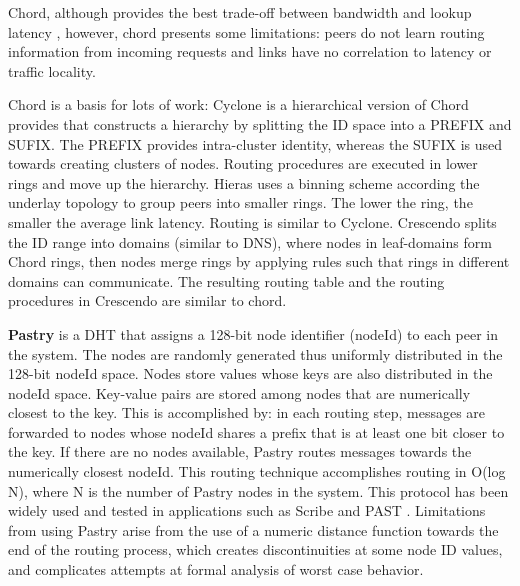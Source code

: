 Chord, although provides the best trade-off between bandwidth and lookup latency \cite{dht_performance_churn}, however, chord presents some limitations: peers do not learn routing information from incoming requests and links have no correlation to latency or traffic locality.

Chord is a basis for lots of work: Cyclone \cite{Artigas2005} is a hierarchical version of Chord provides that constructs a hierarchy by splitting the ID space into a PREFIX and SUFIX. The PREFIX provides intra-cluster identity, whereas the SUFIX is used towards creating clusters of nodes. Routing procedures are executed in lower rings and move up the hierarchy.  Hieras \cite{1240580} uses a binning scheme according the underlay topology to group peers into smaller rings. The lower the ring, the smaller the average link latency. Routing is similar to Cyclone. Crescendo \cite{Ganesan2004} splits the ID range into domains (similar to DNS), where nodes in leaf-domains form Chord rings, then nodes merge rings by applying rules such that rings in different domains can communicate. The resulting routing table and the routing procedures in Crescendo are similar to chord.

    
\textbf{Pastry} \cite{rowstron2001pastry} is a DHT that assigns a 128-bit node identifier (nodeId) to each peer in the system. The nodes are randomly generated thus uniformly distributed in the 128-bit nodeId space. Nodes store values whose keys are also distributed in the nodeId space. Key-value pairs are stored among nodes that are numerically closest to the key. This is accomplished by: in each routing step, messages are forwarded to nodes whose nodeId shares a prefix that is at least one bit closer to the key. If there are no nodes available, Pastry routes messages towards the numerically closest nodeId. This routing technique accomplishes routing in O(log N), where N is the number of Pastry nodes in the system. This protocol has been widely used and tested in applications such as Scribe \cite{10.1007/3-540-45546-9_3} and PAST \cite{990064}. Limitations from using Pastry arise from the use of a numeric distance function towards the end of the routing process, which creates discontinuities at some node ID values, and complicates attempts at formal analysis of worst case behavior.


